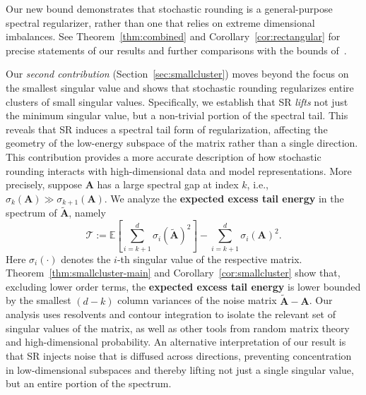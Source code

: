 \documentclass{article}
\newcommand{\Ab}{\mathbf{A}}
\newcommand{\Abtil}{\tilde{\Ab}}
\newcommand{\Tcal}{\mathcal{T}}
\begin{document}
Our new bound demonstrates that stochastic rounding is a general-purpose spectral regularizer, rather than one that relies on extreme dimensional imbalances. See Theorem~\ref{thm:combined} and Corollary~\ref{cor:rectangular} for precise statements of our results and further comparisons with the bounds of~\cite{dexter2025stochastic}.

Our \textit{second contribution} (Section~\ref{sec:smallcluster}) moves beyond the focus on the smallest singular value and shows that stochastic rounding regularizes entire clusters of small singular values. Specifically, we establish that SR \textit{lifts} not just the minimum singular value, but a non-trivial portion of the spectral tail. This reveals that SR induces a spectral tail form of regularization, affecting the geometry of the low-energy subspace of the matrix rather than a single direction. This contribution provides a more accurate description of how stochastic rounding interacts with high-dimensional data and model representations. More precisely, suppose $\Ab$ has a large spectral gap at index $k$, i.e., $\sigma_k (\Ab) \gg \sigma_{k+1}(\Ab)$. We analyze the \textbf{expected excess tail energy} in the spectrum of $\Abtil$, namely
%
\begin{equation}\label{eqn:Tdef}
\Tcal := \mathbb{E}\left[\sum_{i = k+1}^{d} \sigma_i(\Abtil)^2 \right] - \sum_{i = k+1}^{d} \sigma_i(\Ab)^2.   
\end{equation}
%
Here $\sigma_i(\cdot)$ denotes the $i$-th singular value of the respective matrix. Theorem~\ref{thm:smallcluster-main} and Corollary~\ref{cor:smallcluster} show that, excluding lower order terms, the \textbf{expected excess tail energy} is lower bounded by the smallest $(d-k)$ column variances of the noise matrix $\Abtil-\Ab$. Our analysis uses resolvents and contour integration to isolate the relevant set of singular values of the matrix, as well as other tools from random matrix theory and high-dimensional probability. An alternative interpretation of our result is that SR injects noise that is diffused across directions, preventing concentration in low-dimensional subspaces and thereby lifting not just a single singular value, but an entire portion of the spectrum. 
\end{document}
